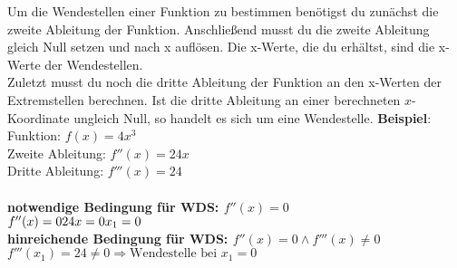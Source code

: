 \documentclass[25pt, a3paper, portrait]{tikzposter}
\begin{document}
\begin{columns}
        {
            Um die Wendestellen einer Funktion zu bestimmen benötigst du zunächst die zweite Ableitung der Funktion.
            Anschließend musst du die zweite Ableitung gleich Null setzen und nach x auflösen.
            Die x-Werte, die du erhältst, sind die x-Werte der Wendestellen. \\
        Zuletzt musst du noch die dritte Ableitung der Funktion an den x-Werten der Extremstellen berechnen.
        Ist die dritte Ableitung an einer berechneten $x$-Koordinate ungleich Null, so handelt es sich um eine Wendestelle.
        \textbf{Beispiel}: \\
        Funktion: $f(x) = 4x^3$\\
        Zweite Ableitung: $f''(x) = 24x$\\
        Dritte Ableitung: $f'''(x) = 24$\\\\
        \textbf{notwendige Bedingung für WDS: $f''(x) = 0$}\\
            $
            f''(x) = 0 \\
            24x = 0 \\
            x_1 = 0
            $
            \\
            \textbf{hinreichende Bedingung für WDS: $f''(x) = 0 \land f'''(x) \ne 0$}\\
            $
            f'''(x_1) = 24 \ne 0 \Rightarrow \text{Wendestelle bei } x_1 = 0
            $
        }
    \end{columns}
\end{document}
